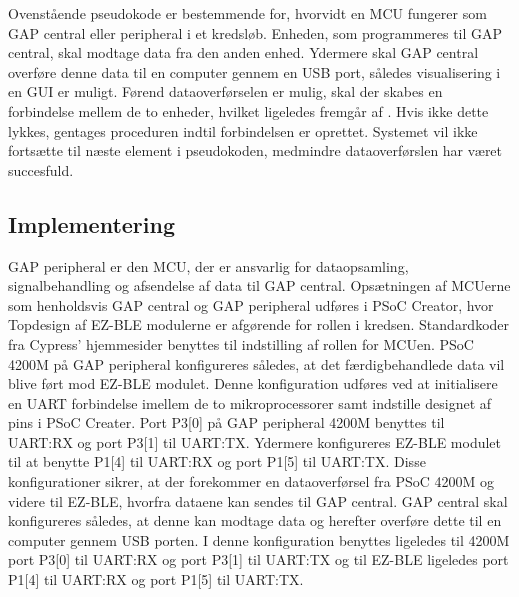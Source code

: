 Ovenstående pseudokode er bestemmende for, hvorvidt en MCU fungerer som GAP central eller peripheral i et kredsløb. Enheden, som programmeres til GAP central, skal modtage data fra den anden enhed. Ydermere skal GAP central overføre denne data til en computer gennem en USB port, således visualisering i en GUI er muligt. \newline
Førend dataoverførselen er mulig, skal der skabes en forbindelse mellem de to enheder, hvilket ligeledes fremgår af . Hvis ikke dette lykkes, gentages proceduren indtil forbindelsen er oprettet. %
Systemet vil ikke fortsætte til næste element i pseudokoden, medmindre dataoverførslen har været succesfuld.  

\subsection{Implementering}
GAP peripheral er den MCU, der er ansvarlig for dataopsamling, signalbehandling og afsendelse af data til GAP central. Opsætningen af MCUerne som henholdsvis GAP central og GAP peripheral udføres i PSoC Creator, hvor Topdesign af EZ-BLE modulerne er afgørende for rollen i kredsen. Standardkoder fra Cypress' hjemmesider benyttes til indstilling af rollen for MCUen. \newline
PSoC 4200M på GAP peripheral konfigureres således, at det færdigbehandlede data vil blive ført mod EZ-BLE modulet. Denne konfiguration udføres ved at initialisere en UART forbindelse imellem de to mikroprocessorer samt indstille designet af pins i PSoC Creater. %
Port P3[0] på GAP peripheral 4200M benyttes til UART:RX og port P3[1] til UART:TX. Ydermere konfigureres EZ-BLE modulet til at benytte P1[4] til UART:RX og port P1[5] til UART:TX. Disse konfigurationer sikrer, at der forekommer en dataoverførsel fra PSoC 4200M og videre til EZ-BLE, hvorfra dataene kan sendes til GAP central. \citep{Semiconductor20164200M} \newline
GAP central skal konfigureres således, at denne kan modtage data og herefter overføre dette til en computer gennem USB porten. I denne konfiguration benyttes ligeledes til 4200M port P3[0] til UART:RX og port P3[1] til UART:TX og til EZ-BLE ligeledes port P1[4] til UART:RX og port P1[5] til UART:TX. 

